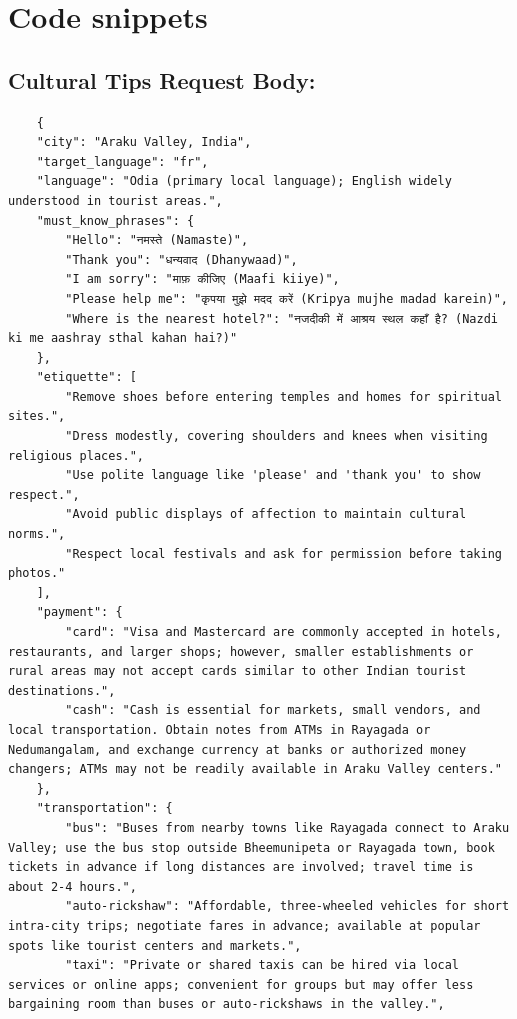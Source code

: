 \chapter{Code snippets}

\section{Cultural Tips Request Body:}
\begin{listing}[H]
\begin{verbatim}
    {
    "city": "Araku Valley, India",
    "target_language": "fr",
    "language": "Odia (primary local language); English widely understood in tourist areas.",
    "must_know_phrases": {
        "Hello": "नमस्ते (Namaste)",
        "Thank you": "धन्यवाद (Dhanywaad)",
        "I am sorry": "माफ़ कीजिए (Maafi kiiye)",
        "Please help me": "कृपया मुझे मदद करें (Kripya mujhe madad karein)",
        "Where is the nearest hotel?": "नजदीकी में आश्रय स्थल कहाँ है? (Nazdi ki me aashray sthal kahan hai?)"
    },
    "etiquette": [
        "Remove shoes before entering temples and homes for spiritual sites.",
        "Dress modestly, covering shoulders and knees when visiting religious places.",
        "Use polite language like 'please' and 'thank you' to show respect.",
        "Avoid public displays of affection to maintain cultural norms.",
        "Respect local festivals and ask for permission before taking photos."
    ],
    "payment": {
        "card": "Visa and Mastercard are commonly accepted in hotels, restaurants, and larger shops; however, smaller establishments or rural areas may not accept cards similar to other Indian tourist destinations.",
        "cash": "Cash is essential for markets, small vendors, and local transportation. Obtain notes from ATMs in Rayagada or Nedumangalam, and exchange currency at banks or authorized money changers; ATMs may not be readily available in Araku Valley centers."
    },
    "transportation": {
        "bus": "Buses from nearby towns like Rayagada connect to Araku Valley; use the bus stop outside Bheemunipeta or Rayagada town, book tickets in advance if long distances are involved; travel time is about 2-4 hours.",
        "auto-rickshaw": "Affordable, three-wheeled vehicles for short intra-city trips; negotiate fares in advance; available at popular spots like tourist centers and markets.",
        "taxi": "Private or shared taxis can be hired via local services or online apps; convenient for groups but may offer less bargaining room than buses or auto-rickshaws in the valley.",

\end{verbatim}
\end{listing}
